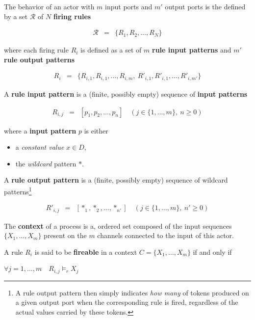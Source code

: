 \medskip
\noindent
The behavior of an actor with $m$ input ports and $m'$ output ports is the defined by a set
$\mathcal{R}$ of $N$ \textbf{firing rules}

\begin{eqnarray*}
  \mathcal{R} & = & \{ R_1, R_2, \ldots, R_N \}
\end{eqnarray*}

where each firing rule $R_i$ is defined as a set of $m$ \textbf{rule input patterns} and $m'$ \textbf{rule
output patterns}

\begin{eqnarray*}
  R_i & = & \{ R_{i,1}, R_{i,1}, \ldots, R_{i,m},\ R'_{i,1}, R'_{i,1}, \ldots, R'_{i,m'} \}
\end{eqnarray*}

\medskip
\noindent
A \textbf{rule input pattern} is a (finite, possibly empty) sequence of \textbf{input patterns} 

\begin{eqnarray*}
  R_{i,j} & = & [ p_1, p_2, \ldots, p_n ] \quad (j \in \{1,\ldots,m\},\ n \geq 0)
\end{eqnarray*}

where a \textbf{input pattern} $p$ is either
\begin{itemize}
\item a \emph{constant value} $x \in D$,
\item the \emph{wildcard} pattern $*$.
\end{itemize}

\medskip
\noindent
A \textbf{rule output pattern} is a (finite, possibly empty) sequence of wildcard
patterns\footnote{A rule output pattern then simply indicates  \emph{how many} of tokens produced
  on a given output port when the corresponding rule is fired, regardless of the actual values
  carried by these tokens.} 

\begin{eqnarray*}
  R'_{i,j} & = & [ *_1, *_2, \ldots, *_{n'} ] \quad (j \in \{1,\ldots,m\},\ n' \geq 0)
\end{eqnarray*}

\medskip
\noindent
The \textbf{context} of a process is a, ordered set composed of the input sequences $\{X_1,\ldots,X_m\}$
present on the $m$ channels connected to the input of this actor.

\medskip
\noindent
A rule $R_i$ is said to be \textbf{fireable} in a context $C=\{X_1,\ldots,X_m\}$ if and only if

\begin{center}
  \begin{math}
    \forall j=1,\ldots,m \quad R_{i,j} \models_r X_j
  \end{math}
\end{center}

